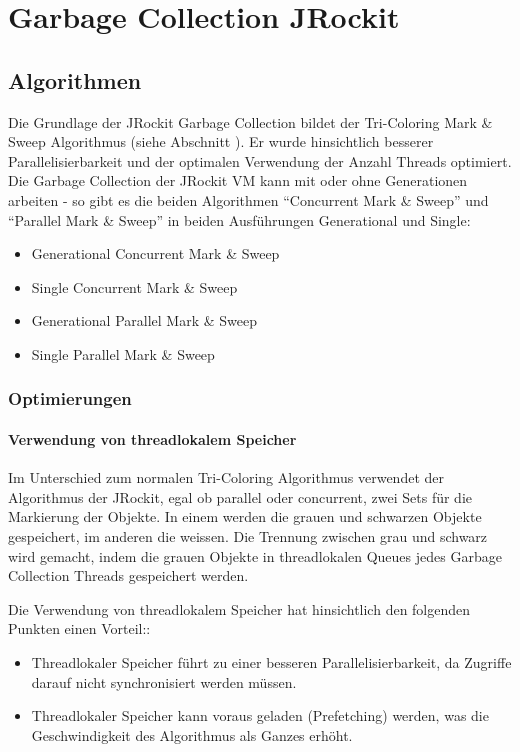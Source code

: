 \chapter{Garbage Collection JRockit}\label{jrockit garbage collection}
\section{Algorithmen}
Die Grundlage der JRockit Garbage Collection bildet der Tri-Coloring Mark \& Sweep Algorithmus (siehe Abschnitt ). Er wurde hinsichtlich besserer Parallelisierbarkeit und der optimalen Verwendung der Anzahl Threads optimiert. Die Garbage Collection der JRockit VM kann mit oder ohne Generationen arbeiten - so gibt es die beiden Algorithmen ``Concurrent Mark \& Sweep'' und ``Parallel Mark \& Sweep'' in beiden Ausführungen Generational und Single:

\begin{itemize}
	\item Generational Concurrent Mark \& Sweep
	\item Single Concurrent Mark \& Sweep
	\item Generational Parallel Mark \& Sweep	
	\item Single Parallel Mark \& Sweep
\end{itemize}

\subsection{Optimierungen}
\subsubsection{Verwendung von threadlokalem Speicher}
Im Unterschied zum normalen Tri-Coloring Algorithmus verwendet der Algorithmus der JRockit, egal ob parallel oder concurrent, zwei Sets für die Markierung der Objekte. In einem werden die grauen und schwarzen Objekte gespeichert, im anderen die weissen. Die Trennung zwischen grau und schwarz wird gemacht, indem die grauen Objekte in threadlokalen Queues jedes Garbage Collection Threads gespeichert werden. 

Die Verwendung von threadlokalem Speicher hat hinsichtlich den folgenden Punkten einen Vorteil:\cite[S. 79]{lagergren2010oracle}:
\begin{itemize}
	\item Threadlokaler Speicher führt zu einer besseren Parallelisierbarkeit, da Zugriffe darauf nicht synchronisiert werden müssen.
	\item Threadlokaler Speicher kann voraus geladen (Prefetching) werden, was die Geschwindigkeit des Algorithmus als Ganzes erhöht.
\end{itemize}


